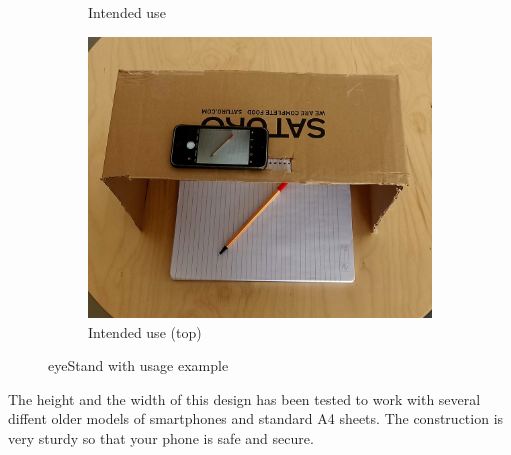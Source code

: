 \documentclass[a4paper]{article}
\begin{document}
\begin{figure}[h!]
\begin{subfigure}[b]{0.4\linewidth}
    \caption{Intended use}
  \end{subfigure}
  \begin{subfigure}[b]{0.4\linewidth}
    \includegraphics[width=\linewidth]{topused.jpg}
    \caption{Intended use (top) }
  \end{subfigure}
  \caption{eyeStand with usage example}
  \label{fig:coffee}
\end{figure}

The height and the width of this design has been tested to work with several diffent older models of smartphones and standard A4 sheets. The construction is very sturdy so that your phone is safe and secure.
\end{document}
